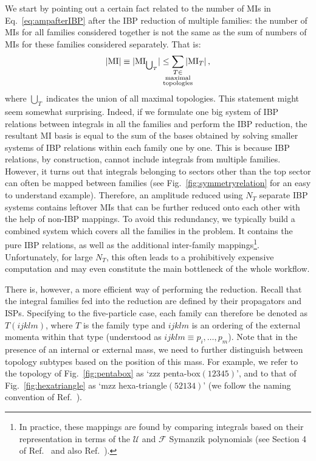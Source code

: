 \documentclass[main.tex]{subfiles}
\begin{document}
We start by pointing out a certain fact related to the number of MIs in Eq.~\ref{eq:ampafterIBP} after the IBP reduction of multiple families: the number of MIs for all families considered together is not the same as the sum of numbers of MIs for these families considered separately. That is:
\begin{equation} \label{eq:noofmis}
    |\text{MI}| \equiv |\text{MI}_{\bigcup_T}| \le \sum_{\mathclap{\substack{T \in \\ \text{maximal} \\ \text{topologies}}}} |\text{MI}_T| \,,
\end{equation}
where $\bigcup_T$ indicates the union of all maximal topologies. This statement might seem somewhat surprising. Indeed, if we formulate one big system of IBP relations between integrals in all the families and perform the IBP reduction, the resultant MI basis is equal to the sum of the bases obtained by solving smaller systems of IBP relations within each family one by one. This is because IBP relations, by construction, cannot include integrals from multiple families. However, it turns out that integrals belonging to sectors other than the top sector can often be mapped between families (see  Fig.~\ref{fig:symmetryrelation} for an easy to understand example). Therefore, an amplitude reduced using $N_T$ separate IBP systems contains leftover MIs that can be further reduced onto each other with the help of non-IBP mappings. To avoid this redundancy, we typically build a combined system which covers all the families in the problem. It contains the pure IBP relations, as well as the additional inter-family mappings\footnote{In practice, these mappings are found by comparing integrals based on their representation in terms of the $\mathcal{U}$ and $\mathcal{F}$ Symanzik polynomials (see Section 4 of Ref.~\cite{Lee:2012cn} and also Ref.~\cite{Pak:2011xt}).}. Unfortunately, for large $N_T$, this often leads to a prohibitively expensive computation and may even constitute the main bottleneck of the whole workflow.

There is, however, a more efficient way of performing the reduction. Recall that the integral families fed into the reduction are defined by their propagators and ISPs. Specifying to the five-particle case, each family can therefore be denoted as $T(ijklm)$, where $T$ is the family type and $ijklm$ is an ordering of the external momenta within that type (understood as $ijklm \equiv p_i,\ldots, p_m$). Note that in the presence of an internal or external mass, we need to further distinguish between topology subtypes based on the position of this mass. For example, we refer to the topology of Fig.~\ref{fig:pentabox} as `zzz penta-box$(12345)$', and to that of Fig.~\ref{fig:hexatriangle} as `mzz hexa-triangle$(52134)$' (we follow the naming convention of Ref.~\cite{Abreu:2020jxa}).
\end{document}
